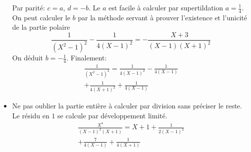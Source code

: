 \begin{itemize}
Par parité: $c=a$, $d=-b$. Le $a$ est facile à calculer par supertildation $a=\frac{1}{4}$. On peut calculer le $b$ par la méthode servant à prouver l'existence et l'unicité de la partie polaire
\begin{displaymath}
 \frac{1}{(X^{2}-1)^{2}} - \frac{1}{4(X-1)^2}=-\frac{X+3}{(X-1)(X+1)^2}
\end{displaymath}
On déduit $b=-\frac{1}{4}$. Finalement:
\begin{multline*}
 \frac{1}{(X^{2}-1)^{2}}=\frac{1}{4(X-1)^2}-\frac{1}{4(X-1)}\\+\frac{1}{4(X+1)^2}+\frac{1}{4(X-1)}
\end{multline*}

\item Ne pas oublier la partie entière à calculer par division sans préciser le reste. Le résidu en $1$ se calcule par développement limité.
\begin{multline*}
  \frac{X^4}{(X-1)^2(X+1)}
  = X + 1 + \frac{1}{2(X-1)^2} \\
  + \frac{7}{4(X-1)} + \frac{1}{4(X+1)} 
\end{multline*}

\end{itemize}

